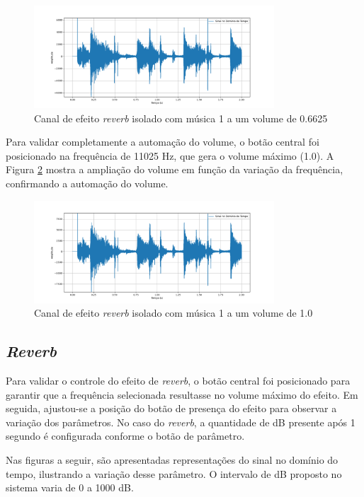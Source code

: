 \begin{figure}[h]
    \centering
    \includegraphics[width=0.8\textwidth]{figuras/fig68.png}
    \caption{Canal de efeito \textit{reverb} isolado com música 1 a um volume de 0.6625}
    \label{fig68}
\end{figure}

Para validar completamente a automação do volume, o botão central foi posicionado na frequência de 11025 Hz, que gera o volume máximo (1.0). A Figura \ref{fig69} mostra a ampliação do volume em função da variação da frequência, confirmando a automação do volume.

\begin{figure}[h]
    \centering
    \includegraphics[width=0.8\textwidth]{figuras/fig69.png}
    \caption{Canal de efeito \textit{reverb} isolado com música 1 a um volume de 1.0}
    \label{fig69}
\end{figure}

\subsection{\textit{Reverb}}

Para validar o controle do efeito de \textit{reverb}, o botão central foi posicionado para garantir que a frequência selecionada resultasse no volume máximo do efeito. Em seguida, ajustou-se a posição do botão de presença do efeito para observar a variação dos parâmetros. No caso do \textit{reverb}, a quantidade de dB presente após 1 segundo é configurada conforme o botão de parâmetro.

Nas figuras a seguir, são apresentadas representações do sinal no domínio do tempo, ilustrando a variação desse parâmetro. O intervalo de dB proposto no sistema varia de 0 a 1000 dB.

